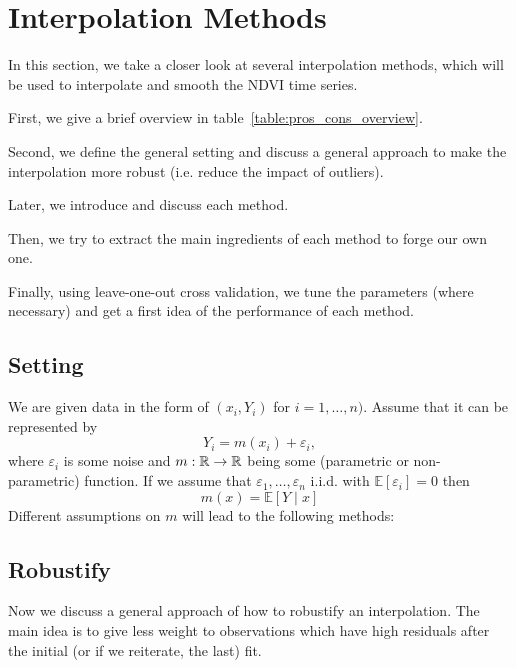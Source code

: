 \newcommand{\RobItPlot}{fitted to different (scl45) NDVI time series. Iterations of a robustifing refit (as indicated in section~\ref{sec:loess_robustify}) are also displayed}


\chapter{Interpolation Methods}

In this section, we take a closer look at several interpolation methods, which will be used to interpolate and smooth the NDVI time series.

First, we give a brief overview in table~\ref{table:pros_cons_overview}.

Second, we define the general setting and discuss a general approach to make the interpolation more robust (i.e. reduce the impact of outliers).

Later, we introduce and discuss each method.

Then, we try to extract the main ingredients of each method to forge our own one.

Finally, using leave-one-out cross validation, we tune the parameters (where necessary) and get a first idea of the performance of each method.


\footnotesize

\normalsize


\section{Setting}
We are given data in the form of $\left(x_{i}, Y_{i}\right)$ for $i=1, \ldots, n)$. Assume that it can be represented by
$$
  Y_{i}=m\left(x_{i}\right)+\varepsilon_{i},
$$
where $\varepsilon_i$ is some noise and $m: \mathbb{R} \rightarrow \mathbb{R}$ being some (parametric or non-parametric) function. If we assume that $\varepsilon_{1}, \ldots, \varepsilon_{n}$ i.i.d. with $\mathbb{E}\left[\varepsilon_{i}\right]=0$ then $$m(x)=\mathbb{E}[Y \mid x]$$
Different assumptions on $m$ will lead to the following methods:

\section{Robustify}
\label{sec:loess_robustify}
Now we discuss a general approach of how to robustify an interpolation. The main idea is to give less weight to observations which have high residuals after the initial (or if we reiterate, the last) fit.

